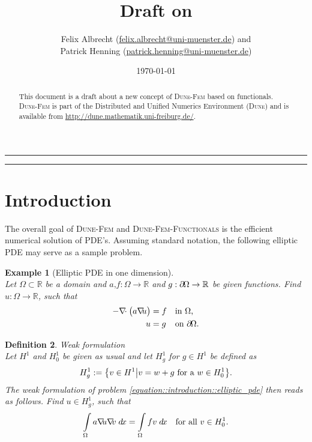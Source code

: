 \documentclass[a4paper,11pt]{article}
\title{Draft on \dunefemfunctionals}
\author{Felix Albrecht (\url{felix.albrecht@uni-muenster.de}) and\\
  Patrick Henning (\url{patrick.henning@uni-muenster.de})
}
\date{\today}
\numberwithin{equation}{section}
\newtheorem{definition}{Definition}[section]
\newtheorem{example}[definition]{Example}
\newcommand{\theoremNewline}{\hspace{1mm}\\}
\newcommand{\theoremEndLine}{\hspace{1mm}}
\newcommand{\dune}{\textsc{Dune}\xspace}
\newcommand{\dunefem}{\textsc{Dune-Fem}\xspace}
\newcommand{\dunefemfunctionals}{\textsc{Dune-Fem-Functionals}\xspace}
\newcommand{\hnS}{\hspace{-1.25pt}}
\newcommand{\divergence}{\nabla\hnS\hnS\hnS\cdot}
\newcommand{\gradient}{\nabla\hnS\hnS}
\newcommand{\boundary}{\partial \hnS}
\newcommand{\dx}{\;d\hnS x}
\newcommand{\komma}{\text{,}}
\newcommand{\punkt}{\text{.}}
\newcommand{\R}{\mathbb{R}}
\begin{document}
  \maketitle

  \begin{abstract}
    This document is a draft about a new concept of \dunefem based on functionals. \dunefem is part of the
    Distributed and Unified Numerics Environment (\dune) and is available from
    \url{http://dune.mathematik.uni-freiburg.de/}.
  \end{abstract}

  \hrule

  \begin{multicols}{2}
    \small\tableofcontents
  \end{multicols}

  \hrule

  \section{Introduction}

    The overall goal of \dunefem and \dunefemfunctionals is the efficient numerical solution of PDE's. Assuming standard
    notation, the following elliptic PDE may serve as a sample problem.

    \begin{example}[Elliptic PDE in one dimension]\theoremNewline
      \label{example::introduction::elliptic_pde}
      Let ${\Omega \subset \R}$ be a domain and ${a\komma f : \Omega \rightarrow \R}$ and
      ${g : \boundary\Omega \rightarrow \R}$ be given functions. Find ${u: \Omega \rightarrow \R}$, such that
      \begin{align}
        \label{equation::introduction::elliptic_pde}
        - \divergence
          \big(
            a \gradient u
          \big)
          &= f &&\text{in } \Omega \komma
        \\
        u &= g &&\text{on } \boundary\Omega \punkt
        \notag
      \end{align}
    \end{example}\theoremEndLine

    \begin{definition}{Weak formulation}\theoremNewline
      \label{definition::introduction::weak_formulation}
      Let $H^1$ and $H^1_0$ be given as usual and let $H^1_g$ for ${g\in H^1}$ be defined as
      \begin{align}
        H^1_g :=
          \big\{
            v \in H^1
          \big|
            v = w + g \text{ for a } w \in H^1_0
          \big\}\punkt
        \notag
      \end{align}
      The weak formulation of problem \eqref{equation::introduction::elliptic_pde} then reads as follows. Find
      ${u \in H^1_g}$, such that
      \begin{align}
        \label{equation::introduction::weak_formulation}
        \int\limits_{\Omega}
          a \gradient u \gradient v
        \dx
        =
        \int\limits_{\Omega}
          f v
        \dx
        &&\text{for all } v \in H^1_0 \punkt
      \end{align}
    \end{definition}\theoremEndLine
\end{document}
